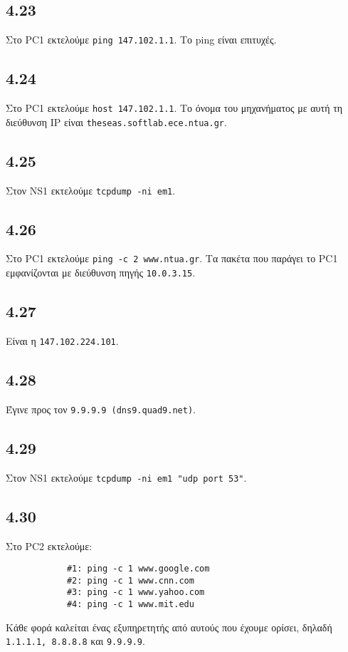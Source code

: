 \documentclass[a4paper, 12pt]{article}
\begin{document}
	\subsection*{4.23}
		Στο PC1 εκτελούμε \verb|ping 147.102.1.1|. Το ping είναι επιτυχές.

	\subsection*{4.24}
		Στο PC1 εκτελούμε \verb|host 147.102.1.1|. Το όνομα του μηχανήματος με αυτή τη διεύθυνση IP είναι \verb|theseas.softlab.ece.ntua.gr|.

	\subsection*{4.25}
		Στον NS1 εκτελούμε \verb|tcpdump -ni em1|.

	\subsection*{4.26}
		Στο PC1 εκτελούμε \verb|ping -c 2 www.ntua.gr|. Τα πακέτα που παράγει το PC1 εμφανίζονται με διεύθυνση πηγής \verb|10.0.3.15|.

	\subsection*{4.27}
		Είναι η \verb|147.102.224.101|.

	\subsection*{4.28}
		Έγινε προς τον \verb|9.9.9.9 (dns9.quad9.net)|.

	\subsection*{4.29}
		Στον NS1 εκτελούμε \verb|tcpdump -ni em1 "udp port 53"|.

	\subsection*{4.30}
		Στο PC2 εκτελούμε:
		
		\begin{verbatim}
			#1: ping -c 1 www.google.com
			#2: ping -c 1 www.cnn.com
			#3: ping -c 1 www.yahoo.com
			#4: ping -c 1 www.mit.edu
		\end{verbatim}
		
		Κάθε φορά καλείται ένας εξυπηρετητής από αυτούς που έχουμε ορίσει, δηλαδή \verb|1.1.1.1, 8.8.8.8| και \verb|9.9.9.9|.
\end{document}
